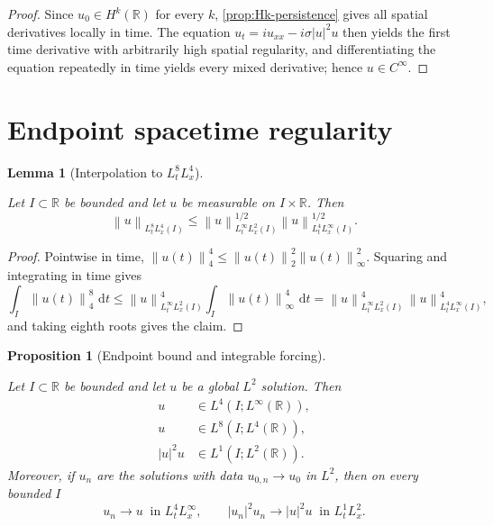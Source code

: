 \documentclass[11pt,oneside]{book}
\providecommand{\uses}[1]{}
\newtheorem{proposition}[theorem]{Proposition}
\newtheorem{lemma}[theorem]{Lemma}
\theoremstyle{definition}
\theoremstyle{remark}
\newcommand{\R}{\mathbb R}
\newcommand{\1}{\mathbf 1}
\newcommand{\dd}{\,\mathrm d}
\newcommand{\norm}[1]{\left\lVert #1\right\rVert}
\begin{document}
\begin{proof}
\uses{prop:Hk-persistence}
Since $u_0\in H^k(\R)$ for every $k$, \cref{prop:Hk-persistence} gives all
spatial derivatives locally in time.  The equation
$u_t=iu_{xx}-i\sigma|u|^2u$ then yields the first time derivative with
arbitrarily high spatial regularity, and differentiating the equation
repeatedly in time yields every mixed derivative; hence $u\in C^\infty$.
\end{proof}

\section{Endpoint spacetime regularity}

\begin{lemma}[Interpolation to $L^8_tL^4_x$]
\label{lem:interp-L8L4}
\uses{def:scalar-mixed-norm}
Let $I\subset\R$ be bounded and let $u$ be measurable on $I\times\R$.  Then
\[
 \norm u_{L^8_tL^4_x(I)}
 \le\norm u_{L^\infty_tL^2_x(I)}^{1/2}
      \norm u_{L^4_tL^\infty_x(I)}^{1/2}.
\]
\end{lemma}

\begin{proof}
\uses{}
Pointwise in time, $\norm{u(t)}_4^4\le\norm{u(t)}_2^2\norm{u(t)}_\infty^2$.
Squaring and integrating in time gives
\[
 \int_I\norm{u(t)}_4^8\,\dd t
 \le\norm u_{L^\infty_tL^2_x(I)}^4\int_I\norm{u(t)}_\infty^4\,\dd t
 =\norm u_{L^\infty_tL^2_x(I)}^4\,\norm u_{L^4_tL^\infty_x(I)}^4,
\]
and taking eighth roots gives the claim.
\end{proof}

\begin{proposition}[Endpoint bound and integrable forcing]
\label{prop:endpoint}
\uses{thm:hom-strichartz, thm:GWP, lem:scalar-mixed-minkowski, lem:interp-L8L4}
Let $I\subset\R$ be bounded and let $u$ be a global $L^2$ solution.  Then
\begin{align}
 u&\in L^4(I;L^\infty(\R)), \label{eq:L4Linfty}\\
 u&\in L^8(I;L^4(\R)),      \label{eq:L8L4}\\
 |u|^2u&\in L^1(I;L^2(\R)). \label{eq:forcing-L1L2}
\end{align}
Moreover, if $u_n$ are the solutions with data $u_{0,n}\to u_0$ in $L^2$, then
on every bounded $I$
\[
 u_n\to u\ \text{ in }L^4_tL^\infty_x,
 \qquad
 |u_n|^2u_n\to|u|^2u\ \text{ in }L^1_tL^2_x.
\]
\end{proposition}
\end{document}
